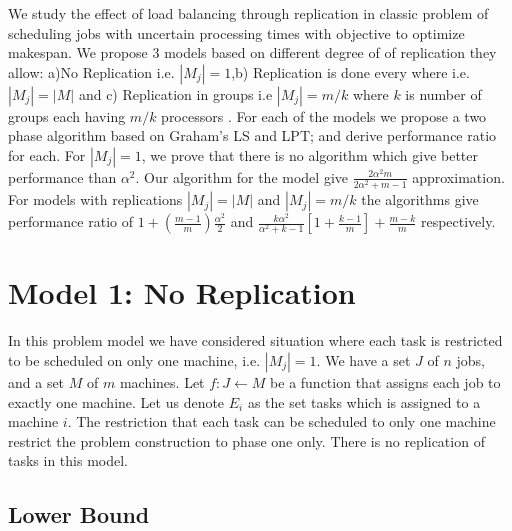 \documentclass[10pt, conference, compsocconf]{IEEEtran}
\begin{document}
We study the effect of load balancing through replication in classic
problem of scheduling jobs with uncertain processing times with
objective to optimize makespan. We propose 3 models based on different
degree of of replication they allow: a)No Replication i.e. $|M_j|=1
$,b) Replication is done every where i.e.$|M_j|=|M|$ and c)
Replication in groups i.e $|M_j|= m/k$ where $k$ is number of groups
each having $m/k$ processors . For each of the models we propose a two
phase algorithm based on Graham's LS and LPT; and derive performance
ratio for each. For $|M_j|=1 $, we prove that there is no algorithm
which give better performance than $\alpha^2$. Our algorithm for the
model give $\frac{2\alpha^{2}m}{2\alpha^{2}+ m-1}$ approximation. For
models with replications $|M_j|=|M|$ and $|M_j|= m/k$ the algorithms
give performance ratio of $ 1 + (\frac{m-1}{m})\frac{\alpha^{2}}{2}$
and $\frac{k\alpha^{2}}{\alpha^{2}+k-1}\left[1+ {\frac{k-1}{m}}
\right]+ {\frac{m-k}{m}}$ respectively.

\section{Model 1: No Replication}\label{sec4} 


In this problem model we have considered situation where each task is
restricted to be scheduled on only one machine, i.e. $|M_j|=1$.  We
have a set $J$ of $ n$ jobs, and a set $M$ of $m$ machines.  Let $f :
J \leftarrow M$ be a function that assigns each job to exactly one
machine. Let us denote $E_{i}$ as the set tasks which is assigned to a
machine $i$.  The restriction that each task can be scheduled to only
one machine restrict the problem construction to phase one only. There
is no replication of tasks in this model.

\subsection{Lower Bound}
\end{document}
